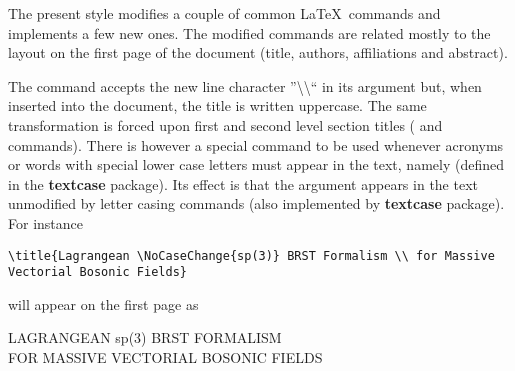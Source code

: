 \documentclass[myclassdoc,debug]{rjparticle}
\begin{document}
The present style modifies a couple of common \LaTeX ~commands and implements a few new ones. The modified commands are related mostly to the layout on the first page of the document (title, authors, affiliations and abstract).

The {\small {}} command accepts the new line character ''\textbackslash\textbackslash`` in its argument but, when inserted into the document, the title is written uppercase. The same transformation is forced upon first and second level section titles ({\small {}} and {\small {}} commands). There is however a special command to be used whenever acronyms or words with special lower case letters must appear in the text, namely  {\small {}} (defined in the \textbf{textcase} package). Its effect is that the argument appears in the text unmodified by letter casing commands (also implemented by \textbf{textcase} package). For instance
\begin{lstlisting}
\title{Lagrangean \NoCaseChange{sp(3)} BRST Formalism \\ for Massive Vectorial Bosonic Fields}
\end{lstlisting}
will appear on the first page as
\begin{center}
LAGRANGEAN sp(3) BRST FORMALISM \\
FOR MASSIVE VECTORIAL BOSONIC FIELDS
\end{center}
\end{document}
